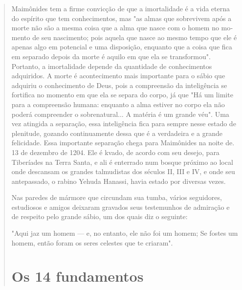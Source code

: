 \begin{quote}
Maimônides tem a firme convicção de que a imortalidade é a vida eterna
do espírito que tem conhecimentos, mas "as almas que sobrevivem após a
morte não são a mesma coisa que a alma que nasce com o homem no mo­mento
de seu nascimento; pois aquela que nasce ao mesmo tempo que ele é apenas
algo em potencial e uma disposição, enquanto que a coisa que fica em
separado depois da morte é aquilo em que ela se transformou". Portanto,
a imor­talidade depende da quantidade de conhecimentos adquiridos. A
morte é acon­tecimento mais importante para o sábio que adquiriu o
conhecimento de Deus, pois a compreensão da inteligência se fortifica no
momento em que ela se sepa­ra do corpo, já que "Há um limite para a
compreensão humana: enquanto a alma estiver no corpo ela não poderá
compreender o sobrenatural... A matéria é um grande véu". Uma vez
atingida a separação, essa inteligência fica para sem­pre nesse estado
de plenitude, gozando continuamente dessa que é a verdadei­ra e a grande
felicidade.
Essa importante separação chega para Maimônides na noite
de. 13 de dezembro de 1204. Ele é kvado, de acordo com
seu desejo, para Tiberíades na Terra Santa, e ali é enterrado num bosque
próximo ao local onde descan­sam os grandes talmudistas dos séculos II,
III e IV, e onde seu antepassado, o rabino Yehuda Hanassi, havia estado
por diversas vezes.

Nas paredes de mármore que circundam sua tumba, vários seguido­res,
estudiosos e amigos deixaram gravados seus testemunhos de admiração e de
respeito pelo grande sábio, um dos quais diz o seguinte:

"Aqui jaz um homem --- e, no entanto, ele não foi um homem; Se fostes um
homem, então foram os seres celestes que te criaram".



\parte{\title}

\section{Os 14 fundamentos}


\end{quote}
